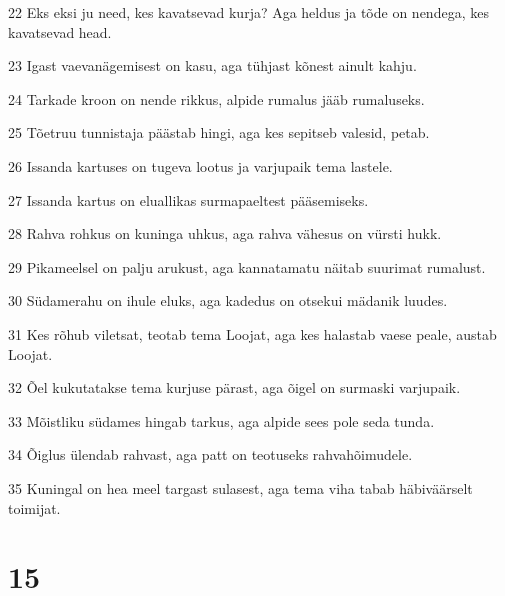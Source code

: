 \par 22 Eks eksi ju need, kes kavatsevad kurja? Aga heldus ja tõde on nendega, kes kavatsevad head.
\par 23 Igast vaevanägemisest on kasu, aga tühjast kõnest ainult kahju.
\par 24 Tarkade kroon on nende rikkus, alpide rumalus jääb rumaluseks.
\par 25 Tõetruu tunnistaja päästab hingi, aga kes sepitseb valesid, petab.
\par 26 Issanda kartuses on tugeva lootus ja varjupaik tema lastele.
\par 27 Issanda kartus on eluallikas surmapaeltest pääsemiseks.
\par 28 Rahva rohkus on kuninga uhkus, aga rahva vähesus on vürsti hukk.
\par 29 Pikameelsel on palju arukust, aga kannatamatu näitab suurimat rumalust.
\par 30 Südamerahu on ihule eluks, aga kadedus on otsekui mädanik luudes.
\par 31 Kes rõhub viletsat, teotab tema Loojat, aga kes halastab vaese peale, austab Loojat.
\par 32 Õel kukutatakse tema kurjuse pärast, aga õigel on surmaski varjupaik.
\par 33 Mõistliku südames hingab tarkus, aga alpide sees pole seda tunda.
\par 34 Õiglus ülendab rahvast, aga patt on teotuseks rahvahõimudele.
\par 35 Kuningal on hea meel targast sulasest, aga tema viha tabab häbiväärselt toimijat.

\chapter{15}

